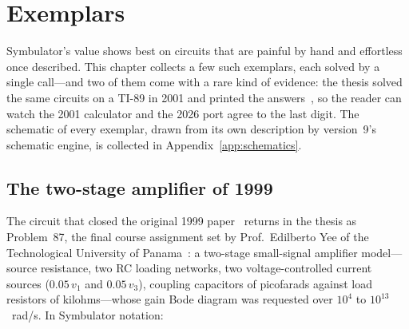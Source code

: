 \documentclass[11pt,oneside]{report}
\begin{document}
\chapter{Exemplars}
\label{ch:exemplars}

Symbulator's value shows best on circuits that are painful by hand and
effortless once described. This chapter collects a few such exemplars,
each solved by a single call---and two of them come with a rare kind
of evidence: the thesis solved the same circuits on a TI-89 in 2001
and printed the answers~\cite{thesis2000}, so the reader can watch
the 2001 calculator and the 2026 port agree to the last digit. The
schematic of every exemplar, drawn from its own description by
version~9's schematic engine, is collected in
Appendix~\ref{app:schematics}.

\section{The two-stage amplifier of 1999}
\label{sec:amplifier}

The circuit that closed the original 1999 paper~\cite{paper1999}
returns in the thesis as Problem~87, the final course assignment set
by Prof.\ Edilberto Yee of the Technological University of
Panama~\cite[\S12.2]{thesis2000}: a two-stage small-signal amplifier
model---source resistance, two RC loading networks, two
voltage-controlled current sources ($0.05\,v_1$ and $0.05\,v_3$),
coupling capacitors of picofarads against load resistors of
kilohms---whose gain Bode diagram was requested over $10^{4}$ to
$10^{13}$~rad/s. In Symbulator notation:
\end{document}
